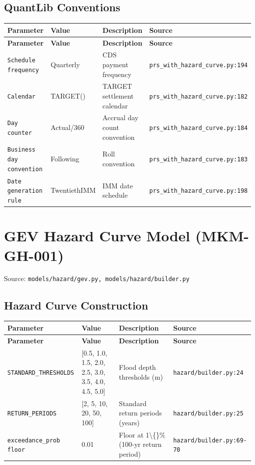 \documentclass[11pt,a4paper]{article}
\begin{document}
\subsection{QuantLib Conventions}

\begin{longtable}{p{4cm}p{4cm}p{5.5cm}p{3.5cm}}
    \toprule
    \textbf{Parameter} & \textbf{Value} & \textbf{Description} & \textbf{Source} \\
    \midrule
    \endfirsthead
    \toprule
    \textbf{Parameter} & \textbf{Value} & \textbf{Description} & \textbf{Source} \\
    \midrule
    \endhead
    \bottomrule
    \endfoot
    \texttt{Schedule frequency} & Quarterly & CDS payment frequency & {\scriptsize \texttt{prs\_with\_hazard\_curve.py:194}} \\
    \texttt{Calendar} & TARGET() & TARGET settlement calendar & {\scriptsize \texttt{prs\_with\_hazard\_curve.py:182}} \\
    \texttt{Day counter} & Actual/360 & Accrual day count convention & {\scriptsize \texttt{prs\_with\_hazard\_curve.py:184}} \\
    \texttt{Business day convention} & Following & Roll convention & {\scriptsize \texttt{prs\_with\_hazard\_curve.py:183}} \\
    \texttt{Date generation rule} & TwentiethIMM & IMM date schedule & {\scriptsize \texttt{prs\_with\_hazard\_curve.py:198}} \\
\end{longtable}

\clearpage

\section{GEV Hazard Curve Model (MKM-GH-001)}

Source: \texttt{models/hazard/gev.py, models/hazard/builder.py}

\subsection{Hazard Curve Construction}

\begin{longtable}{p{4cm}p{4cm}p{5.5cm}p{3.5cm}}
    \toprule
    \textbf{Parameter} & \textbf{Value} & \textbf{Description} & \textbf{Source} \\
    \midrule
    \endfirsthead
    \toprule
    \textbf{Parameter} & \textbf{Value} & \textbf{Description} & \textbf{Source} \\
    \midrule
    \endhead
    \bottomrule
    \endfoot
    \texttt{STANDARD\_THRESHOLDS} & [0.5, 1.0, 1.5, 2.0, 2.5, 3.0, 3.5, 4.0, 4.5, 5.0] & Flood depth thresholds (m) & {\scriptsize \texttt{hazard/builder.py:24}} \\
    \texttt{RETURN\_PERIODS} & [2, 5, 10, 20, 50, 100] & Standard return periods (years) & {\scriptsize \texttt{hazard/builder.py:25}} \\
    \texttt{exceedance\_prob floor} & 0.01 & Floor at 1\textbackslash\{\}\% (100-yr return period) & {\scriptsize \texttt{hazard/builder.py:69-70}} \\
\end{longtable}
\end{document}
